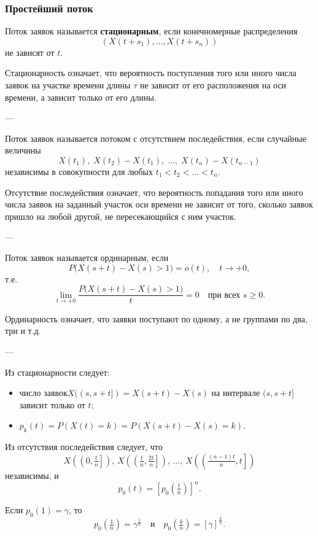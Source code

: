 \subsubsection*{Простейший поток}

Поток заявок называется \textbf{стационарным}, если конечномерные распределения
\[
	(X(t + s_1), \ldots, X(t + s_n))
\]
не зависят от $t$.

Стационарность означает, что вероятность поступления того или иного числа заявок
на участке времени длины $\tau$ не зависит от его расположения на оси времени,
а зависит только от его длины.

---

Поток заявок называется потоком с отсутствием последействия, если случайные величины
\[
	X(t_1), \; X(t_2) - X(t_1), \; \ldots, \; X(t_n) - X(t_{n-1})
\]
независимы в совокупности для любых $t_1 < t_2 < \ldots < t_n$.

Отсутствие последействия означает, что вероятность попадания того или иного числа заявок
на заданный участок оси времени не зависит от того, сколько заявок пришло
на любой другой, не пересекающийся с ним участок.

---

Поток заявок называется ординарным, если
\[
	P\big(X(s + t) - X(s) > 1\big) = o(t), \quad t \to +0,
\]
т.е.
\[
	\lim_{t \to +0} \frac{P\big(X(s + t) - X(s) > 1\big)}{t} = 0
	\quad \text{при всех } s \ge 0.
\]

Ординарность означает, что заявки поступают по одному,
а не группами по два, три и т.д.

---

Из стационарности следует:

\begin{itemize}
	\item число заявок$X((s, s + t]) = X(s + t) - X(s)$
	      на интервале $(s, s + t]$ зависит только от $t$;

	\item $p_k(t) = P(X(t) = k) = P(X(s + t) - X(s) = k)$.
\end{itemize}

Из отсутствия последействия следует, что
\[
	X\!\left(\left(0, \tfrac{t}{n}\right]\right),\,
	X\!\left(\left(\tfrac{t}{n}, \tfrac{2t}{n}\right]\right),\,
	\ldots,\,
	X\!\left(\left(\tfrac{(n - 1)t}{n}, t\right]\right)
\]
независимы, и
\[
	p_0(t) = [p_0\!\left(\tfrac{t}{n}\right)]^n.
\]

Если $p_0(1) = \gamma$, то
\[
	p_0\!\left(\tfrac{1}{n}\right) = \gamma^{\tfrac{1}{n}}
	\quad \text{и} \quad
	p_0\!\left(\tfrac{k}{n}\right) = [\gamma]^{\tfrac{k}{n}}.
\]

